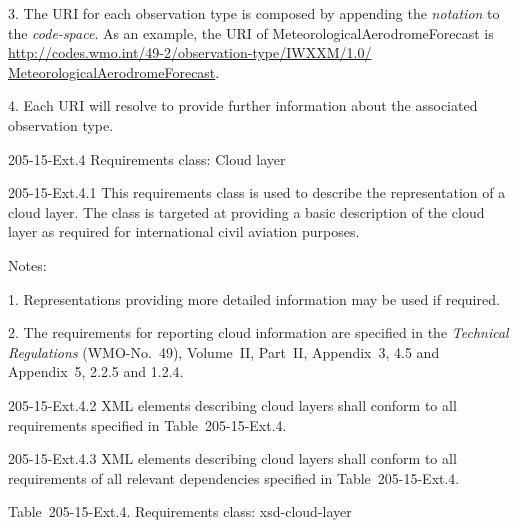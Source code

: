 3. The URI for each observation type is composed by appending the \emph{notation} to the \emph{code-space}. As an example, the URI of MeteorologicalAerodromeForecast is \href{http://codes.wmo.int/49-2/observation-type/IWXXM/1.0/MeteorologicalAerodromeForecast}{http://codes.wmo.int/49-2/observation-type/IWXXM/1.0/\\
MeteorologicalAerodromeForecast}.

4. Each URI will resolve to provide further information about the associated observation type.

205-15-Ext.4 Requirements class: Cloud layer

205-15-Ext.4.1 This requirements class is used to describe the representation of a cloud layer. The class is targeted at providing a basic description of the cloud layer as required for international civil aviation purposes.

Notes:

1. Representations providing more detailed information may be used if required.

2. The requirements for reporting cloud information are specified in the \emph{Technical Regulations} (WMO-No.~49), Volume~II, Part~II, Appendix~3, 4.5 and Appendix~5, 2.2.5 and 1.2.4.

205-15-Ext.4.2 XML elements describing cloud layers shall conform to all requirements specified in Table~205-15-Ext.4.

205-15-Ext.4.3 XML elements describing cloud layers shall conform to all requirements of all relevant dependencies specified in Table~205-15-Ext.4.

Table~205-15-Ext.4. Requirements class: xsd-cloud-layer

